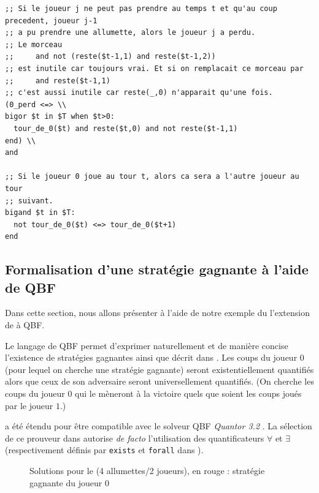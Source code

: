 \newpage
\begin{lstlisting}
;; Si le joueur j ne peut pas prendre au temps t et qu'au coup precedent, joueur j-1
;; a pu prendre une allumette, alors le joueur j a perdu.
;; Le morceau
;;     and not (reste($t-1,1) and reste($t-1,2))
;; est inutile car toujours vrai. Et si on remplacait ce morceau par
;;     and reste($t-1,1)
;; c'est aussi inutile car reste(_,0) n'apparait qu'une fois.
(0_perd <=> \\
bigor $t in $T when $t>0:
  tour_de_0($t) and reste($t,0) and not reste($t-1,1)
end) \\
and

;; Si le joueur 0 joue au tour t, alors ca sera a l'autre joueur au tour
;; suivant.
bigand $t in $T:
  not tour_de_0($t) <=> tour_de_0($t+1)
end
\end{lstlisting}

\subsection{Formalisation d'une stratégie gagnante à l'aide de QBF}\label{chap:touist:touist:qbf}

Dans cette section, nous allons présenter à l'aide de notre exemple du \game l'extension de \touist à QBF.

Le langage de QBF permet d'exprimer naturellement et de manière concise l'existence de stratégies gagnantes ainsi que décrit dans \cite{DBLP:series/txtcs/KroeningS16}. Les coups du joueur 0 (pour lequel on cherche une stratégie gagnante) seront existentiellement quantifiés alors que ceux de son adversaire seront universellement quantifiés. (On cherche les coups du joueur $0$ qui le mèneront à la victoire quels que soient les coups joués par le joueur $1$.)

\touist a été étendu pour être compatible avec le solveur QBF \emph{Quantor 3.2} \cite{Biere:2004:RE:2103144.2103150}. La sélection de ce prouveur dans \touist autorise \emph{de facto} l'utilisation des quantificateurs $\forall$ et $\exists$ (respectivement définis par \verb+exists+ et \verb+forall+ dans \touist).

\begin{figure}[h!]
\centering

\caption{Solutions pour le \game (4 allumettes/2 joueurs), en rouge : stratégie gagnante du joueur 0}
\label{fig:solutions}
\vspace{-0.5cm}\end{figure}



